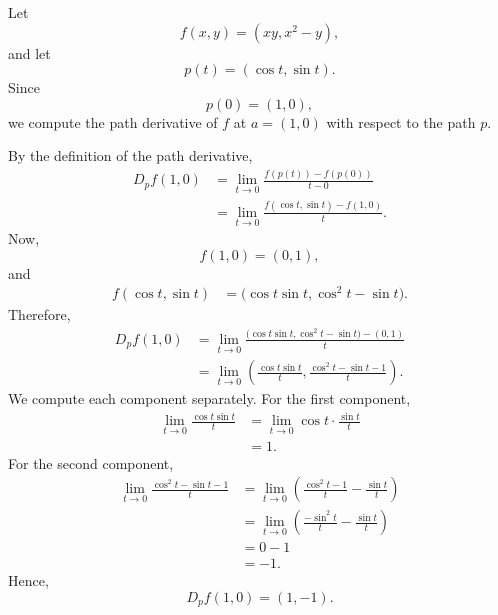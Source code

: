 	\begin{example}
	  \label{ex:path-derivative-of-a-vector-field}
		Let
		\begin{equation}
			f(x,y) = (xy, x^2-y),
		\end{equation}
		and let
		\begin{equation}
			p(t) = (\cos t, \sin t).
		\end{equation}
		Since
		\begin{equation}
			p(0) = (1,0),
		\end{equation}
		we compute the path derivative of $f$ at $a=(1,0)$ with respect to the path $p$.

		By the definition of the path derivative,
		\begin{align}
			D_p f(1,0)
			&=
			\lim_{t\to 0}
			\frac{f(p(t))-f(p(0))}{t-0} \\
			&=
			\lim_{t\to 0}
			\frac{f(\cos t,\sin t)-f(1,0)}{t}.
		\end{align}
		Now,
		\begin{equation}
			f(1,0) = (0,1),
		\end{equation}
		and
		\begin{align}
			f(\cos t,\sin t)
			&=
			\big(\cos t \sin t, \cos^2 t - \sin t\big).
		\end{align}
		Therefore,
		\begin{align}
			D_p f(1,0)
			&=
			\lim_{t\to 0}
			\frac{
				\big(\cos t \sin t, \cos^2 t - \sin t\big) - (0,1)
			}{t} \\
			&=
			\lim_{t\to 0}
			\left(
				\frac{\cos t \sin t}{t},
				\frac{\cos^2 t - \sin t - 1}{t}
			\right).
		\end{align}
		We compute each component separately. For the first component,
		\begin{align}
			\lim_{t\to 0}
			\frac{\cos t \sin t}{t}
			&=
			\lim_{t\to 0}
			\cos t \cdot \frac{\sin t}{t} \\
			&=
			1.
		\end{align}
		For the second component,
		\begin{align}
			\lim_{t\to 0}
			\frac{\cos^2 t - \sin t - 1}{t}
			&=
			\lim_{t\to 0}
			\left(
				\frac{\cos^2 t - 1}{t}
				-
				\frac{\sin t}{t}
			\right) \\
			&=
			\lim_{t\to 0}
			\left(
				\frac{-\sin^2 t}{t}
				-
				\frac{\sin t}{t}
			\right) \\
			&=
			0 - 1 \\
			&=
			-1.
		\end{align}
		Hence,
		\begin{equation}
			D_p f(1,0) = (1,-1).
		\end{equation}
	\end{example}

